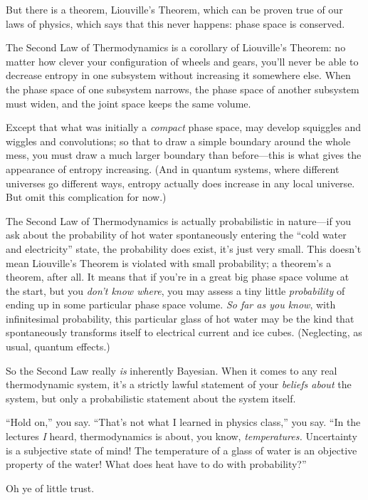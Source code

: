 {
 But there is a theorem, Liouville's Theorem, which
can be proven true of our laws of physics, which says that this never
happens: phase space is conserved.}

{
 The Second Law of Thermodynamics is a corollary of
Liouville's Theorem: no matter how clever your
configuration of wheels and gears, you'll never be able
to decrease entropy in one subsystem without increasing it somewhere
else. When the phase space of one subsystem narrows, the phase space of
another subsystem must widen, and the joint space keeps the same
volume.}

{
 Except that what was initially a \textit{compact} phase space, may
develop squiggles and wiggles and convolutions; so that to draw a
simple boundary around the whole mess, you must draw a much larger
boundary than before---this is what gives the appearance of entropy
increasing. (And in quantum systems, where different universes go
different ways, entropy actually does increase in any local universe.
But omit this complication for now.)}

{
 The Second Law of Thermodynamics is actually probabilistic in
nature---if you ask about the probability of hot water spontaneously
entering the ``cold water and
electricity'' state, the probability does exist,
it's just very small. This doesn't mean
Liouville's Theorem is violated with small probability;
a theorem's a theorem, after all. It means that if
you're in a great big phase space volume at the start,
but you \textit{don't know where}, you may assess a
tiny little \textit{probability} of ending up in some particular phase
space volume. \textit{So far as you know}, with infinitesimal
probability, this particular glass of hot water may be the kind that
spontaneously transforms itself to electrical current and ice cubes.
(Neglecting, as usual, quantum effects.)}

{
 So the Second Law really \textit{is} inherently Bayesian. When it
comes to any real thermodynamic system, it's a strictly
lawful statement of your \textit{beliefs about} the system, but only a
probabilistic statement about the system itself.}

{
 ``Hold on,'' you say.
``That's not what I learned in physics
class,'' you say. ``In the lectures
\textit{I} heard, thermodynamics is about, you know,
\textit{temperatures.} Uncertainty is a subjective state of mind! The
temperature of a glass of water is an objective property of the water!
What does heat have to do with probability?''}

{
 Oh ye of little trust.}

